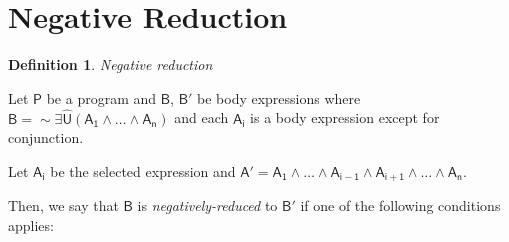 \documentclass[inscr,ack,preface]{dithesis}
\theoremstyle{definition}
\newtheorem{definition}{Definition}[]
\newcommand{\msf}[1]{$\mathsf{#1}$}
\begin{document}
\section{Negative Reduction}
\begin{definition}{\emph{Negative reduction}}

Let \msf{P} be a program and \msf{B}, \msf{B'} be body expressions where \msf{B = \sim \exists \widehat{U} \left( A_1 \land \dots \land A_n \right)} and each \msf{A_i} is a body expression except for conjunction.

Let \msf{A_i} be the selected expression and \msf{A' = A_1 \land \dots \land A_{i-1} \land A_{i+1} \land \dots \land A_n}.

Then, we say that \msf{B} is \emph{negatively-reduced} to \msf{B'} if one of the following conditions applies:


\end{definition}
\end{document}
